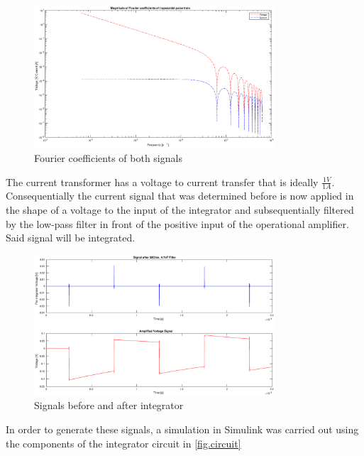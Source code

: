 \begin{figure}[h!tb]
\centerline{\includegraphics[width=0.8\textwidth]{figures/Method/signal_simulation/fourierla.eps}}
\caption{Fourier coefficients of both signals}
\label{fig.fourierla}
\end{figure}

The current transformer has a voltage to current transfer that is ideally $\frac{1V}{1A}$. 
Consequentially the current signal that was determined before is now applied in the shape of a voltage to the input of the integrator and subsequentially
filtered by the low-pass filter in front of the positive input of the operational amplifier. Said signal will be integrated.


\begin{figure}[h!tb]
\centerline{\includegraphics[width=0.8\textwidth]{figures/Method/signal_simulation/integrated.eps}}
\caption{Signals before and after integrator}
\label{fig.integrator}
\end{figure}

In order to generate these signals, a simulation in Simulink was carried out using the components of the integrator circuit in \ref{fig.circuit}

